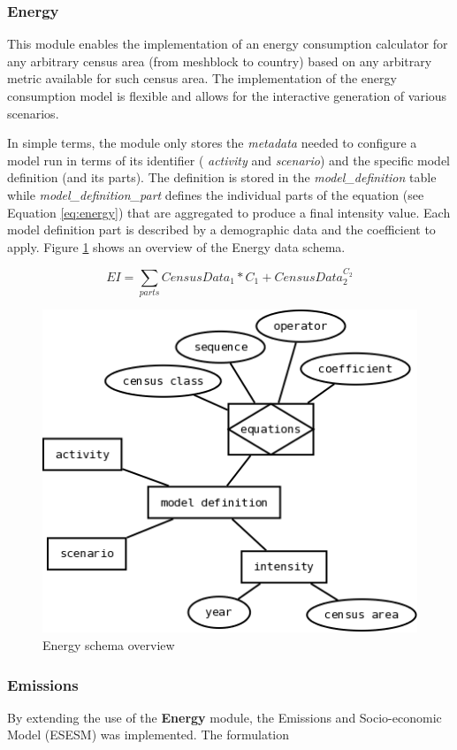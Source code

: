 \subsubsection*{Energy}

This module enables the implementation of an energy consumption calculator for any arbitrary census area (from meshblock to country) based on any arbitrary metric available for such census area. The implementation of the energy consumption model is flexible and allows for the interactive generation of various scenarios. 

In simple terms, the module only stores the \textit{metadata} needed to configure a model run in terms of its identifier ( \textit{activity} and \textit{scenario}) and the specific model definition (and its parts). The definition is stored in the \textit{model\_definition} table while \textit{model\_definition\_part} defines the individual parts of the equation (see Equation \ref{eq:energy}) that are aggregated to produce a final intensity
value. Each model definition part is described by a demographic data and the coefficient to apply. Figure \ref{fig:energy_diag} shows an overview of the Energy data schema.

\begin{equation}
\label{eq:energy}
EI=\sum_{parts}{CensusData_1*C_1+CensusData_2^{C_2}}
\end{equation}


\begin{figure}
	\caption{Energy schema overview}
	\label{fig:energy_diag}
	\includegraphics[width = 12cm]{energy.png}
\end{figure}

\subsubsection*{Emissions}
By extending the use of the \textbf{Energy} module, the Emissions and Socio-economic Model (ESESM) was implemented. The formulation
